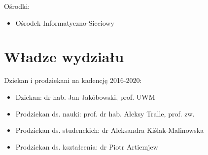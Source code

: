 \documentclass[a4paper,12pt]{article}
\begin{document}
Ośrodki:

\begin{itemize}

\item Ośrodek Informatyczno-Sieciowy

\end{itemize}

\section{Władze wydziału}

Dziekan i prodziekani na kadencję 2016-2020:

\begin{itemize}
\item Dziekan: dr hab. Jan Jakóbowski, prof. UWM
\item Prodziekan ds. nauki: prof. dr hab. Aleksy Tralle, prof. zw.
\item Prodziekan ds. studenckich: dr Aleksandra Kiślak-Malinowska
\item Prodziekan ds. kształcenia: dr Piotr Artiemjew
\end{itemize}
\end{document}
